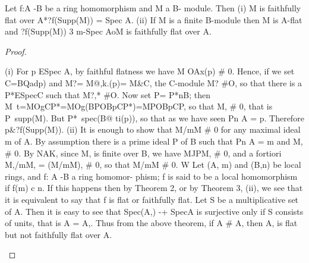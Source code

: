\begin{theorem}[Theorem 7.3]\label{mcrt-auto-theorem-7-3}\uses{}
\begin{mathematicalrecord}
Let f:A -B       be a ring homomorphism      and M a B-
module. Then
   (i) M is faithfully flat over A*?f(Supp(M))     = Spec A.
   (ii) If M is a finite B-module then
M is A-flat and ?f(Supp(M))       3 m-Spec AoM is faithfully flat over A.
\end{mathematicalrecord}
\end{theorem}
\begin{proof}
\begin{mathematicalrecord}
(i) For p ESpec A, by faithful flatness we have M OAx(p) # 0. Hence,
if we set C=BQadp)            and M?= M@,k.(p)=      M&C,    the C-module
M? #O, so that there is a P*ESpecC such that M?,* #O. Now set
P= P*nB; then
             M~t=MOgCP*=MOg(BPOBpCP*)=MPOBpCP,
so that M, # 0, that is P~supp(M).         But P*~spec(B@ ti(p)), so that as
we have seen Pn A = p. Therefore p&?f(Supp(M)).
(ii) It is enough to show that M/mM # 0 for any maximal ideal m of A. By
assumption there is a prime ideal P of B such that Pn A = m and
M, # 0. By NAK, since M, is finite over B, we have MJPM,              # 0, and
a fortiori M,/mM,       = (M/mM),    # 0, so that M/mM # 0. W
    Let (A, m) and (B,n) be local rings, and f: A -B         a ring homomor-
phism; f is said to be a local homomorphism if f(m) c n. If this happens then
by Theorem 2, or by Theorem 3, (ii), we see that it is equivalent to say that f
is flat or faithfully flat.
    Let S be a multiplicative   set of A. Then it is easy to see that Spec(A,)
 -+ SpecA is surjective only if S consists of units, that is A = A,. Thus
from the above theorem, if A # A, then A, is flat but not faithfully flat over
A.
\end{mathematicalrecord}
\end{proof}


